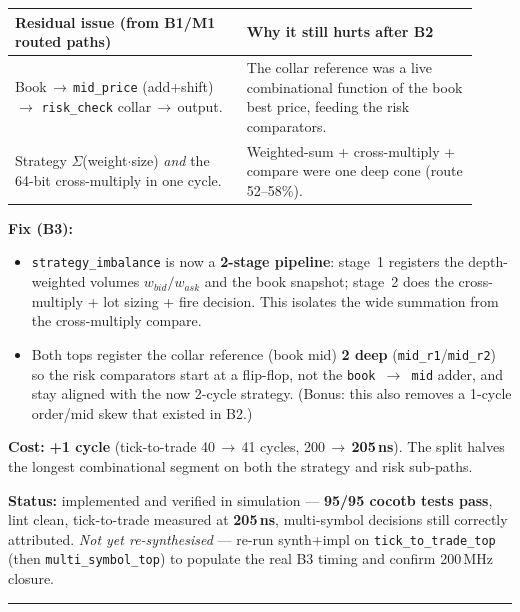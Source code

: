 \documentclass[10pt,a4paper]{article}
\begin{document}
\begin{center}
\renewcommand{\arraystretch}{1.3}
\begin{tabular}{@{}p{0.46\linewidth} p{0.46\linewidth}@{}}
\toprule
\textbf{Residual issue (from B1/M1 routed paths)} & \textbf{Why it still hurts after B2} \\
\midrule
Book\,$\rightarrow$\,\texttt{mid\_price} (add+shift)\,$\rightarrow$ \texttt{risk\_check} collar\,$\rightarrow$\,output. & The collar reference was a live combinational function of the book best price, feeding the risk comparators. \\
Strategy $\Sigma$(weight$\cdot$size) \emph{and} the 64-bit cross-multiply in one cycle. & Weighted-sum + cross-multiply + compare were one deep cone (route 52--58\%). \\
\bottomrule
\end{tabular}
\end{center}

\noindent\textbf{Fix (B3):}
\begin{itemize}\itemsep2pt
  \item \texttt{strategy\_imbalance} is now a \textbf{2-stage pipeline}: stage~1
  registers the depth-weighted volumes $w_{bid}/w_{ask}$ and the book snapshot;
  stage~2 does the cross-multiply + lot sizing + fire decision. This isolates the
  wide summation from the cross-multiply compare.
  \item Both tops register the collar reference (book mid) \textbf{2 deep}
  (\texttt{mid\_r1}/\texttt{mid\_r2}) so the risk comparators start at a flip-flop,
  not the \texttt{book\,$\rightarrow$\,mid} adder, and stay aligned with the now
  2-cycle strategy. (Bonus: this also removes a 1-cycle order/mid skew that
  existed in B2.)
\end{itemize}

\noindent\textbf{Cost:} \textbf{+1 cycle} (tick-to-trade 40\,$\rightarrow$\,41
cycles, 200\,$\rightarrow$\,\textbf{205\,ns}). The split halves the longest
combinational segment on both the strategy and risk sub-paths.

\noindent\textbf{Status:} implemented and verified in simulation ---
\textbf{95/95 cocotb tests pass}, lint clean, tick-to-trade measured at
\textbf{205\,ns}, multi-symbol decisions still correctly attributed. \emph{Not
yet re-synthesised} --- re-run synth+impl on \texttt{tick\_to\_trade\_top}
(then \texttt{multi\_symbol\_top}) to populate the real B3 timing and confirm
200\,MHz closure.

\textcolor{rulegray}{\rule{\linewidth}{1pt}}
\end{document}
